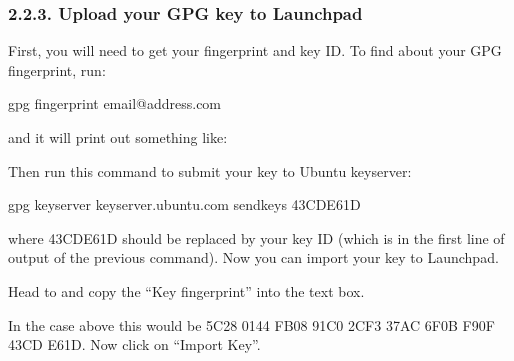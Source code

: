 \documentclass[letterpaper,10pt,english]{sphinxmanual}
\begin{document}
\subsubsection{2.2.3. Upload your GPG key to Launchpad}
\label{\detokenize{docs/packaging_guide/getting_started:upload-your-gpg-key-to-launchpad}}
First, you will need to get your fingerprint and key ID.
To find about your GPG fingerprint, run:

\begin{sphinxVerbatim}[commandchars=\\\{\}]
\PYGZdl{} gpg \PYGZhy{}\PYGZhy{}fingerprint email@address.com
\end{sphinxVerbatim}

and it will print out something like:

\begin{sphinxVerbatim}[commandchars=\\\{\}]
    
                   
     
    
\end{sphinxVerbatim}

Then run this command to submit your key to Ubuntu keyserver:

\begin{sphinxVerbatim}[commandchars=\\\{\}]
\PYGZdl{} gpg \PYGZhy{}\PYGZhy{}keyserver keyserver.ubuntu.com \PYGZhy{}\PYGZhy{}send\PYGZhy{}keys 43CDE61D
\end{sphinxVerbatim}

where 43CDE61D should be replaced by your key ID (which is in the first line of output of the previous command). Now you can import your key to Launchpad.

Head to  and copy the “Key fingerprint” into the text box.

In the case above this would be 5C28 0144 FB08 91C0 2CF3  37AC 6F0B F90F 43CD E61D.
Now click on “Import Key”.
\end{document}
